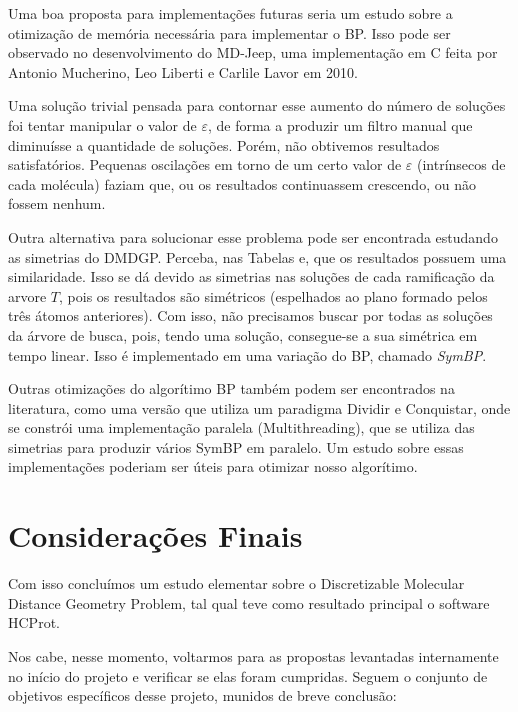 \documentclass[a4paper,12pt]{article}
\begin{document}
	Uma boa proposta para implementações futuras seria um estudo sobre a otimização de memória necessária para implementar o BP. Isso pode ser observado no desenvolvimento do MD-Jeep, uma implementação em C feita por Antonio Mucherino, Leo Liberti e Carlile Lavor em 2010.
	
	Uma solução trivial pensada para contornar esse aumento do número de soluções foi tentar manipular o valor de $\varepsilon$, de forma a produzir um filtro manual que diminuísse a quantidade de soluções. Porém, não obtivemos resultados satisfatórios. Pequenas oscilações em torno de um certo valor de $\varepsilon$ (intrínsecos de cada molécula) faziam que, ou os resultados continuassem crescendo, ou não fossem nenhum.
	
	Outra alternativa para solucionar esse problema pode ser encontrada estudando as simetrias do DMDGP. Perceba, nas Tabelas e, que os resultados possuem uma similaridade. Isso se dá devido as simetrias nas soluções de cada ramificação da arvore $T$, pois os resultados são simétricos (espelhados ao plano formado pelos três átomos anteriores). Com isso, não precisamos buscar por todas as soluções da árvore de busca, pois, tendo uma solução, consegue-se a sua simétrica em tempo linear. Isso é implementado em uma variação do BP, chamado \textit{SymBP}.
	
	Outras otimizações do algorítimo BP também podem ser encontrados na literatura, como uma versão que utiliza um paradigma Dividir e Conquistar, onde se constrói uma implementação paralela (Multithreading), que se utiliza das simetrias para produzir vários SymBP em paralelo. Um estudo sobre essas implementações poderiam ser úteis para otimizar nosso algorítimo.
	
	\newpage
	\section{Considerações Finais}
	Com isso concluímos um estudo elementar sobre o Discretizable Molecular Distance Geometry Problem, tal qual teve como resultado principal o software HCProt. 
	
	Nos cabe, nesse momento, voltarmos para as propostas levantadas internamente no início do projeto e verificar se elas foram cumpridas. Seguem o conjunto de objetivos específicos desse projeto, munidos de breve conclusão:
	
\end{document}
